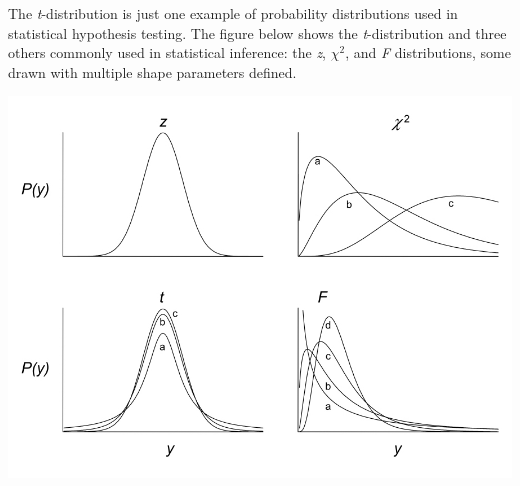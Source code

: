 \documentclass[]{book}
\begin{document}
The \emph{t}-distribution is just one example of probability distributions used in statistical hypothesis testing. The figure below shows the \emph{t}-distribution and three others commonly used in statistical inference: the \emph{z}, \(\chi^2\), and \emph{F} distributions, some drawn with multiple shape parameters defined.

\begin{center}\includegraphics[width=0.5\linewidth]{images/week_3.003} \end{center}
\end{document}
